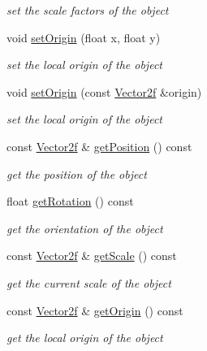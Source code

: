 \begin{DoxyCompactItemize}
\begin{DoxyCompactList}\small\item\em set the scale factors of the object \end{DoxyCompactList}\item 
void \mbox{\hyperlink{classsf_1_1_transformable_a56c67bd80aae8418d13fb96c034d25ec}{set\+Origin}} (float x, float y)
\begin{DoxyCompactList}\small\item\em set the local origin of the object \end{DoxyCompactList}\item 
void \mbox{\hyperlink{classsf_1_1_transformable_aa93a835ffbf3bee2098dfbbc695a7f05}{set\+Origin}} (const \mbox{\hyperlink{classsf_1_1_vector2}{Vector2f}} \&origin)
\begin{DoxyCompactList}\small\item\em set the local origin of the object \end{DoxyCompactList}\item 
const \mbox{\hyperlink{classsf_1_1_vector2}{Vector2f}} \& \mbox{\hyperlink{classsf_1_1_transformable_a73f9739bc6e74db2cea154bc8e94ec46}{get\+Position}} () const
\begin{DoxyCompactList}\small\item\em get the position of the object \end{DoxyCompactList}\item 
float \mbox{\hyperlink{classsf_1_1_transformable_aa00b5c5d4a06ac24a94dd72c56931d3a}{get\+Rotation}} () const
\begin{DoxyCompactList}\small\item\em get the orientation of the object \end{DoxyCompactList}\item 
const \mbox{\hyperlink{classsf_1_1_vector2}{Vector2f}} \& \mbox{\hyperlink{classsf_1_1_transformable_a73819fdea80ca8a06fad8a0067b4588c}{get\+Scale}} () const
\begin{DoxyCompactList}\small\item\em get the current scale of the object \end{DoxyCompactList}\item 
const \mbox{\hyperlink{classsf_1_1_vector2}{Vector2f}} \& \mbox{\hyperlink{classsf_1_1_transformable_a37ea3500afac234814a43ce809ef264e}{get\+Origin}} () const
\begin{DoxyCompactList}\small\item\em get the local origin of the object \end{DoxyCompactList}\item 

\end{DoxyCompactItemize}
